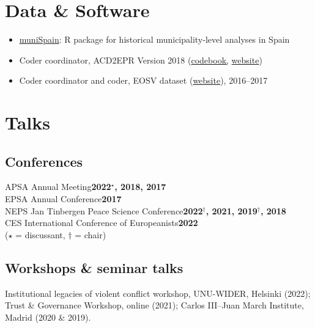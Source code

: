 \documentclass[a4paper, 12pt]{article}
\begin{document}
\section*{Data \& Software}

\begin{itemize}[leftmargin=*, nolistsep]
  \item \href{https://github.com/franvillamil/muniSpain}{muniSpain}: R package for historical municipality-level analyses in Spain
	\item Coder coordinator, ACD2EPR Version 2018 (\href{https://icr.ethz.ch/data/epr/acd2epr/ACD2EPR-2018_Codebook.pdf}{codebook,} \href{https://icr.ethz.ch/data/epr/acd2epr/}{website})
	\item Coder coordinator and coder, EOSV dataset (\href{https://snis.ch/project/civilian-victimization-conflict-escalation/}{website}), 2016--2017
\end{itemize}

\section*{Talks}

\subsection*{Conferences}

\noindent
APSA Annual Meeting\hfill\textbf{2022$^\star$, 2018, 2017}\\
EPSA Annual Conference\hfill\textbf{2017}\\
NEPS Jan Tinbergen Peace Science Conference\hfill\textbf{2022$^\dagger$, 2021, 2019$^\dagger$, 2018}\\
CES International Conference of Europeanists\hfill\textbf{2022}\\\vspace{15pt}
\hfill{\footnotesize ($\star$ = discussant, $\dagger$ = chair)}

\vspace{-20pt}

\subsection*{Workshops \& seminar talks}

Institutional legacies of violent conflict workshop, UNU-WIDER, Helsinki (2022); Trust \& Governance Workshop, online (2021); Carlos III--Juan March Institute, Madrid (2020 \& 2019).
\end{document}
